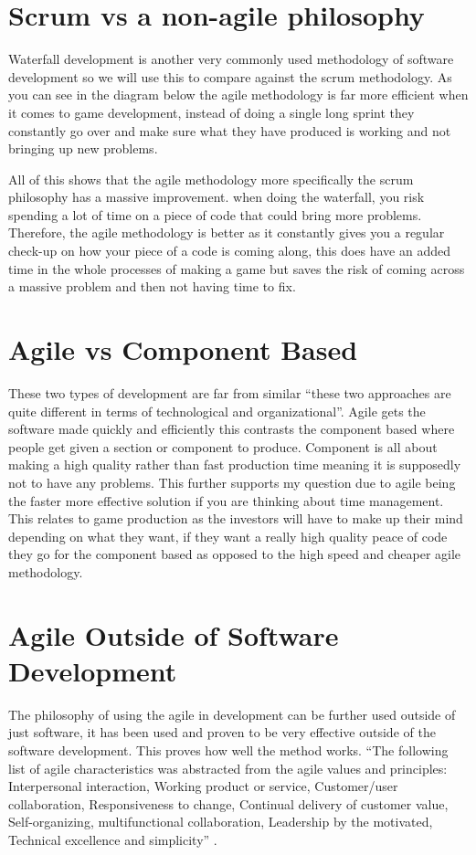 \documentclass{scrartcl}
\begin{document}
\section{Scrum vs a non-agile philosophy}
Waterfall development is another very commonly used methodology of software development so we will use this to compare against the scrum methodology. As you can see in the diagram below the agile methodology is far more efficient when it comes to game development, instead of doing a single long sprint they constantly go over and make sure what they have produced is working and not bringing up new problems.

All of this shows that the agile methodology more specifically the scrum philosophy has a massive improvement. when doing the waterfall, you risk spending a lot of time on a piece of code that could bring more problems. Therefore, the agile methodology is better as it constantly gives you a regular check-up on how your piece of a code is coming along, this does have an added time in the whole processes of making a game but saves the risk of coming across a massive problem and then not having time to fix.
\section{Agile vs Component Based}
These two types of development are far from similar \cite{2} “these two approaches are quite diﬀerent in terms of technological and organizational”. Agile gets the software made quickly and efficiently this contrasts the component based where people get given a section or component to produce. Component is all about making a high quality rather than fast production time meaning it is supposedly not to have any problems. This further supports my question due to agile being the faster more effective solution if you are thinking about time management. This relates to game production as the investors will have to make up their mind depending on what they want, if they want a really high quality peace of code they go for the component based as opposed to the high speed and cheaper agile methodology.
\section{Agile Outside of Software Development}
The philosophy of using the agile in development can be further used outside of just software, it has been used and proven to be very effective outside of the software development. This proves how well the method works. “The following list of agile characteristics was abstracted from the agile values and principles: 
Interpersonal interaction,
Working product or service,
Customer/user collaboration,
Responsiveness to change,
Continual delivery of customer value,
Self-organizing, multifunctional collaboration,
Leadership by the motivated,
Technical excellence and simplicity” \cite{1}. 
\end{document}
